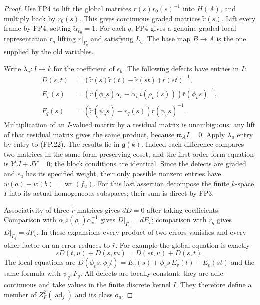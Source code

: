 \begin{proof}
Use FP4 to lift the global matrices
$r(s)r_0(s)^{-1}$ into $H(A)$, and multiply back by $r_0(s)$.
This gives continuous graded matrices $\widetilde r(s)$.
Lift every frame by FP4, setting $\widetilde\alpha_{v_0}=1$.
For each $q$, FP4 gives a genuine graded local representation
$r_q$ lifting $r|_{\Gamma_q}$ and satisfying $L_q$.
The base map $B\to A$ is the one supplied by the old variables.

Write $\lambda_u:I\to k$ for the coefficient of $\epsilon_u$.
The following defects have entries in $I$:
\[
 \begin{split}
 D(s,t)&=(\widetilde r(s)\widetilde r(t)-\widetilde r(st))
                                      \bar r(st)^{-1},\\
 E_v(s)&=(\widetilde r(\phi_vs)\widetilde\alpha_v
             -\widetilde\alpha_v\,i(\rho_v(s)))
                                      \bar r(\phi_vs)^{-1},\\
 F_q(s)&=(\widetilde r(\psi_qs)-r_q(s))
                                      \bar r(\psi_qs)^{-1}.
 \end{split}
 \tag{FP.22}
\]
Multiplication of an $I$-valued matrix by a residual matrix is
unambiguous: any lift of that residual matrix gives the same
product, because $\mathfrak m_AI=0$.
Apply $\lambda_u$ entry by entry to (FP.22).
The results lie in $\mathfrak g(k)$.
Indeed each difference compares two matrices in the same
form-preserving coset, and the first-order form equation is
$Y^tJ+JY=0$; the block conditions are identical.
Since the defects are graded and $\epsilon_u$ has its specified
weight, their only possible nonzero entries have
$w(a)-w(b)=\operatorname{wt}(f_u)$.
For this last assertion decompose the finite $k$-space $I$ into
its actual homogeneous subspaces; their sum is direct by FP3.

Associativity of three $\widetilde r$ matrices gives
$dD=0$ after taking coefficients.
Comparison with
$\widetilde\alpha_v i(\rho_v)\widetilde\alpha_v^{-1}$
gives $D|_{\Gamma_v}=dE_v$; comparison with $r_q$ gives
$D|_{\Gamma_q}=dF_q$.
In these expansions every product of two errors vanishes and
every other factor on an error reduces to $\bar r$.
For example the global equation is exactly
\[
 sD(t,u)+D(s,tu)=D(st,u)+D(s,t).
 \tag{FP.23}
\]
The local equations are
$D(\phi_vs,\phi_vt)=E_v(s)+\phi_vs\,E_v(t)-E_v(st)$
and the same formula with $\psi_q,F_q$.
All defects are locally constant: they are adic-continuous and
take values in the finite discrete kernel $I$.
They therefore define a member of $Z^2_F(\operatorname{ad}_j)$
and its class $o_u$.


\end{proof}
